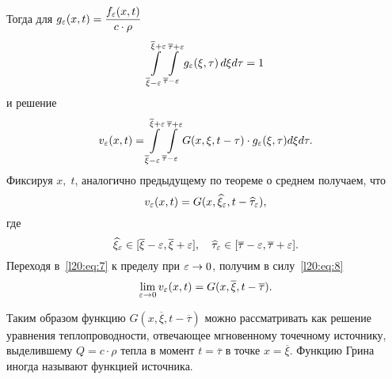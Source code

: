 \noindent Тогда для $\displaystyle g_{\varepsilon}(x,t)=\frac{f_{\varepsilon}(x,t)}{c\cdot\rho}$
\begin{equation*}
	\int\limits_{\overline{\xi}-\varepsilon}^{\overline{\xi}+\varepsilon}\int\limits_{\overline{\tau}-\varepsilon}^{\overline{\tau}+\varepsilon} g_{\varepsilon}(\xi,\tau)\,d\xi d\tau=1
\end{equation*}
и решение 
\begin{equation*}
	v_{\varepsilon}(x,t)=\int\limits_{\overline{\xi}-\varepsilon}^{\overline{\xi}+\varepsilon}\int\limits_{\overline{\tau}-\varepsilon}^{\overline{\tau}+\varepsilon} G(x,\xi,t-\tau)\cdot g_{\varepsilon}(\xi,\tau)d\xi d\tau.
\end{equation*}
Фиксируя $x,\;t$, аналогично предыдущему по теореме о среднем получаем, что 
\begin{equation}\label{l20:eq:7}
	v_{\varepsilon}(x,t)=G(x,\widehat{\xi}_{\varepsilon},t-\widehat{\tau}_{\varepsilon}),
\end{equation}
где
\begin{equation}\label{l20:eq:8}
	\widehat{\xi}_{\varepsilon}\in[\overline{\xi}-\varepsilon,\overline{\xi}+\varepsilon],\quad \widehat{\tau}_{\varepsilon}\in[\overline{\tau}-\varepsilon,\overline{\tau}+\varepsilon].
\end{equation}
Переходя в~\eqref{l20:eq:7} к пределу при $\varepsilon\to0$, получим в силу~\eqref{l20:eq:8}
\begin{equation*}
	\lim\limits_{\varepsilon\to0}v_{\varepsilon}(x,t)=G(x,\overline{\xi},t-\overline{\tau}).
\end{equation*} 

Таким образом функцию $G(x,\overline{\xi},t-\overline{\tau})$ можно рассматривать как решение уравнения теплопроводности, отвечающее мгновенному точечному источнику, выделившему $Q=c\cdot\rho$ тепла в момент $t=\overline{\tau}$ в точке $x=\overline{\xi}$. Функцию Грина иногда называют функцией источника.
\vfill
\newpage
